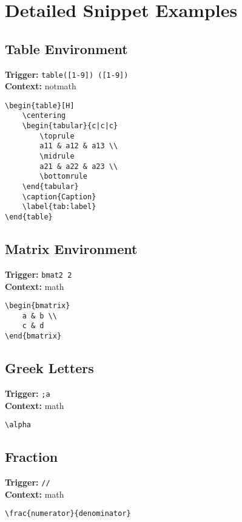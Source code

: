 \documentclass{article}
\begin{document}
\section{Detailed Snippet Examples}

\subsection{Table Environment}
\textbf{Trigger:} \texttt{table([1-9])\ ([1-9])} \\
\textbf{Context:} notmath \\
\begin{lstlisting}
\begin{table}[H]
    \centering
    \begin{tabular}{c|c|c}
        \toprule
        a11 & a12 & a13 \\
        \midrule
        a21 & a22 & a23 \\
        \bottomrule
    \end{tabular}
    \caption{Caption}
    \label{tab:label}
\end{table}
\end{lstlisting}

\subsection{Matrix Environment}
\textbf{Trigger:} \texttt{bmat2\ 2} \\
\textbf{Context:} math \\
\begin{lstlisting}
\begin{bmatrix}
    a & b \\
    c & d 
\end{bmatrix}
\end{lstlisting}

\subsection{Greek Letters}
\textbf{Trigger:} \texttt{;a} \\
\textbf{Context:} math \\
\begin{lstlisting}
\alpha
\end{lstlisting}

\subsection{Fraction}
\textbf{Trigger:} \texttt{//} \\
\textbf{Context:} math \\
\begin{lstlisting}
\frac{numerator}{denominator}
\end{lstlisting}
\end{document}
